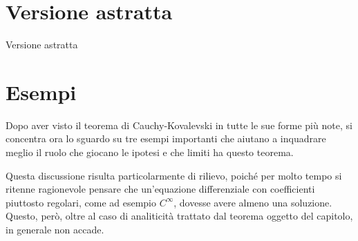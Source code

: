 \section{Versione astratta}
Versione astratta

\section{Esempi}
Dopo aver visto il teorema di Cauchy-Kovalevski in tutte le sue forme più note, si concentra ora lo sguardo su tre esempi importanti 
che aiutano a inquadrare meglio il ruolo che giocano le ipotesi e che limiti ha questo teorema.

Questa discussione risulta particolarmente di rilievo, poiché per molto tempo si ritenne ragionevole pensare 
che un'equazione differenziale con coefficienti piuttosto regolari, come ad esempio $C^\infty$, dovesse avere almeno una soluzione.
Questo, però, oltre al caso di analiticità trattato dal teorema oggetto del capitolo, in generale non accade.

\setcounter{example}{0}

